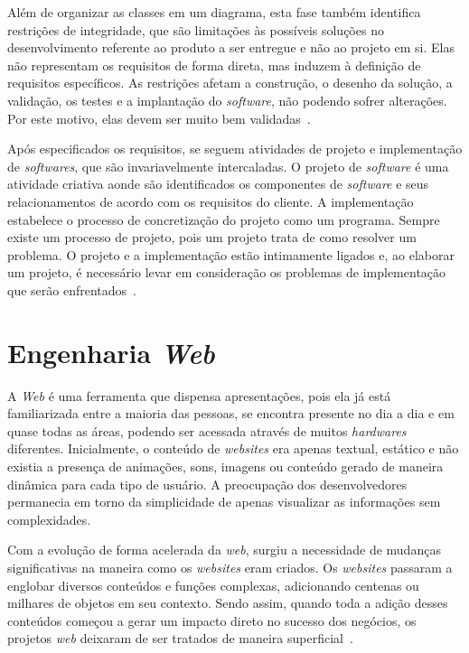 Além de organizar as classes em um diagrama, esta fase também identifica restrições de integridade, que são limitações às possíveis soluções no desenvolvimento referente ao produto a ser entregue e não ao projeto em si. Elas não representam os requisitos de forma direta, mas induzem à definição de requisitos específicos. As restrições afetam a construção, o desenho da solução, a validação, os testes e a implantação do \textit{software}, não podendo sofrer alterações. Por este motivo, elas devem ser muito bem validadas~\cite{vazquez-et-al:erson16}.

Após especificados os requisitos, se seguem atividades de projeto e implementação de \textit{softwares}, que são invariavelmente intercaladas. O projeto de \textit{software} é uma atividade criativa aonde são identificados os componentes de \textit{software} e seus relacionamentos de acordo com os requisitos do cliente. A implementação estabelece o processo de concretização do projeto como um programa. Sempre existe um processo de projeto, pois um projeto trata de como resolver um problema. O projeto e a implementação estão intimamente ligados e, ao elaborar um projeto, é necessário levar em consideração os problemas de implementação que serão enfrentados~\cite{sommerville:es11}.



\section{Engenharia \textit{Web}}
\label{sec-ref-engenharia-web}

A \textit{Web} é uma ferramenta que dispensa apresentações, pois ela já está familiarizada entre a maioria das pessoas, se encontra presente no dia a dia e em quase todas as áreas, podendo ser acessada através de muitos \textit{hardwares} diferentes. Inicialmente, o conteúdo de \textit{websites} era apenas textual, estático e não existia a presença de animações, sons, imagens ou conteúdo gerado de maneira dinâmica para cada tipo de usuário. A preocupação dos desenvolvedores permanecia em torno da simplicidade de apenas visualizar as informações sem complexidades.

Com a evolução de forma acelerada da \textit{web}, surgiu a necessidade de mudanças significativas na maneira como os \textit{websites} eram criados. Os \textit{websites} passaram a englobar diversos conteúdos e funções complexas, adicionando centenas ou milhares de objetos em seu contexto. Sendo assim, quando toda a adição desses conteúdos começou a gerar um impacto direto no sucesso dos negócios, os projetos \textit{web} deixaram de ser tratados de maneira superficial~\cite{pressman:es11}.

